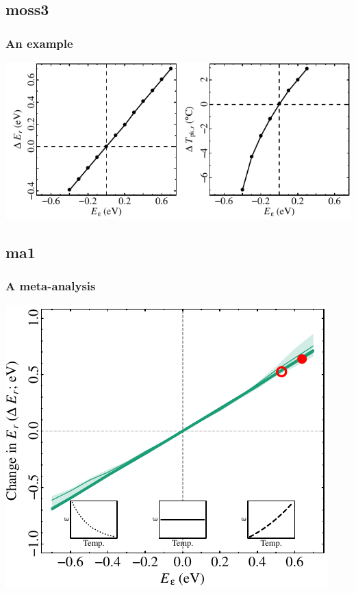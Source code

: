 \documentclass{beamer}
\begin{document}
\subsection{moss3}
\begin{frame}
  \frametitle{An example}

  \begin{center}
    \includegraphics{figs/example_intro_pres2.pdf}
  \end{center}
\end{frame}



\subsection{ma1}
\begin{frame}
  \frametitle{A meta-analysis}

  \begin{center}
    \includegraphics{figs/sofia_pres1.pdf}
  \end{center}
\end{frame}
\end{document}

